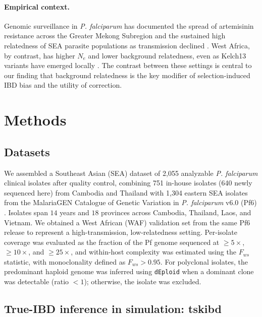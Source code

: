 \documentclass[11pt]{article}
\begin{document}
\paragraph{Empirical context.} Genomic surveillance in \textit{P. falciparum} has documented the spread of artemisinin resistance across the Greater Mekong Subregion \citep{ashley2014tracking,miotto2015genetic} and the sustained high relatedness of SEA parasite populations as transmission declined \citep{amato2017piperaquine}. West Africa, by contrast, has higher $N_e$ and lower background relatedness, even as Kelch13 variants have emerged locally \citep{verity2020diversity}. The contrast between these settings is central to our finding that background relatedness is the key modifier of selection-induced IBD bias and the utility of correction.

\section{Methods}

\subsection{Datasets}

We assembled a Southeast Asian (SEA) dataset of 2,055 analyzable \textit{P. falciparum} clinical isolates after quality control, combining 751 in-house isolates (640 newly sequenced here) from Cambodia and Thailand with 1,304 eastern SEA isolates from the MalariaGEN Catalogue of Genetic Variation in \textit{P. falciparum} v6.0 (Pf6) \citep{malariagen2021pf6}. Isolates span $14$ years and $18$ provinces across Cambodia, Thailand, Laos, and Vietnam. We obtained a West African (WAF) validation set from the same Pf6 release to represent a high-transmission, low-relatedness setting. Per-isolate coverage was evaluated as the fraction of the Pf genome sequenced at $\geq 5\times$, $\geq 10\times$, and $\geq 25\times$, and within-host complexity was estimated using the $F_{ws}$ statistic, with monoclonality defined as $F_{ws} > 0.95$. For polyclonal isolates, the predominant haploid genome was inferred using \texttt{dEploid} \citep{zhu2018deploid} when a dominant clone was detectable (ratio $<1$); otherwise, the isolate was excluded.

\subsection{True-IBD inference in simulation: tskibd}
\end{document}
